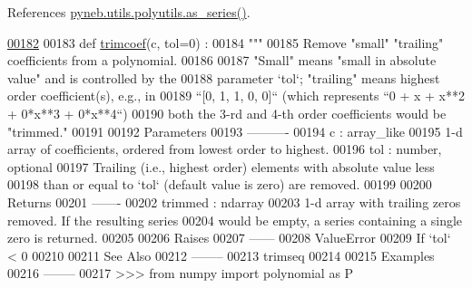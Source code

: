 References \hyperlink{polyutils_8py_source_l00115}{pyneb.\-utils.\-polyutils.\-as\-\_\-series()}.


\begin{DoxyCode}
\hypertarget{namespacepyneb_1_1utils_1_1polyutils_l00182}{}\hyperlink{namespacepyneb_1_1utils_1_1polyutils_a505e3038cfd08b7f444ecca2234daa46}{00182} 
00183 \textcolor{keyword}{def }\hyperlink{namespacepyneb_1_1utils_1_1polyutils_a505e3038cfd08b7f444ecca2234daa46}{trimcoef}(c, tol=0) :
00184     \textcolor{stringliteral}{"""}
00185 \textcolor{stringliteral}{    Remove "small" "trailing" coefficients from a polynomial.}
00186 \textcolor{stringliteral}{}
00187 \textcolor{stringliteral}{    "Small" means "small in absolute value" and is controlled by the}
00188 \textcolor{stringliteral}{    parameter `tol`; "trailing" means highest order coefficient(s), e.g., in}
00189 \textcolor{stringliteral}{    ``[0, 1, 1, 0, 0]`` (which represents ``0 + x + x**2 + 0*x**3 + 0*x**4``)}
00190 \textcolor{stringliteral}{    both the 3-rd and 4-th order coefficients would be "trimmed."}
00191 \textcolor{stringliteral}{}
00192 \textcolor{stringliteral}{    Parameters}
00193 \textcolor{stringliteral}{    ----------}
00194 \textcolor{stringliteral}{    c : array\_like}
00195 \textcolor{stringliteral}{        1-d array of coefficients, ordered from lowest order to highest.}
00196 \textcolor{stringliteral}{    tol : number, optional}
00197 \textcolor{stringliteral}{        Trailing (i.e., highest order) elements with absolute value less}
00198 \textcolor{stringliteral}{        than or equal to `tol` (default value is zero) are removed.}
00199 \textcolor{stringliteral}{}
00200 \textcolor{stringliteral}{    Returns}
00201 \textcolor{stringliteral}{    -------}
00202 \textcolor{stringliteral}{    trimmed : ndarray}
00203 \textcolor{stringliteral}{        1-d array with trailing zeros removed.  If the resulting series}
00204 \textcolor{stringliteral}{        would be empty, a series containing a single zero is returned.}
00205 \textcolor{stringliteral}{}
00206 \textcolor{stringliteral}{    Raises}
00207 \textcolor{stringliteral}{    ------}
00208 \textcolor{stringliteral}{    ValueError}
00209 \textcolor{stringliteral}{        If `tol` < 0}
00210 \textcolor{stringliteral}{}
00211 \textcolor{stringliteral}{    See Also}
00212 \textcolor{stringliteral}{    --------}
00213 \textcolor{stringliteral}{    trimseq}
00214 \textcolor{stringliteral}{}
00215 \textcolor{stringliteral}{    Examples}
00216 \textcolor{stringliteral}{    --------}
00217 \textcolor{stringliteral}{    >>> from numpy import polynomial as P}

\end{DoxyCode}
